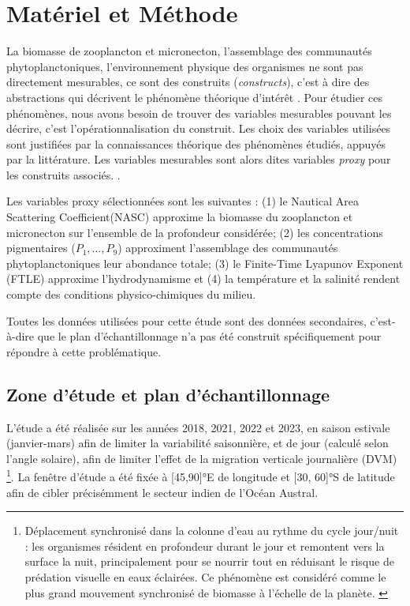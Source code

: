 \chapter{Matériel et Méthode}
La biomasse de zooplancton et micronecton, l'assemblage des communautés phytoplanctoniques, l'environnement physique des organismes ne sont pas directement mesurables, ce sont des construits (\textit{constructs}), c'est à dire des abstractions qui décrivent le phénomène théorique d'intérêt \cite{edwards2000nature}. Pour étudier ces phénomènes, nous avons besoin de trouver des variables mesurables pouvant les décrire, c'est l'opérationnalisation du construit. Les choix des variables utilisées sont justifiées par la connaissances théorique des phénomènes étudiés, appuyés par la littérature. Les variables mesurables sont alors dites variables \textit{proxy} pour les construits associés. \cite{shmueli2010explain}.
 
 
 Les variables proxy sélectionnées sont les suivantes : (1) le Nautical Area Scattering Coefficient(NASC) approxime la biomasse du zooplancton et micronecton sur l'ensemble de la profondeur considérée; (2) les concentrations pigmentaires ($P_1, \ldots, P_9$) approximent l'assemblage des communautés phytoplanctoniques leur abondance totale; (3) le Finite-Time Lyapunov Exponent (FTLE) approxime l'hydrodynamisme et (4) la température et la salinité rendent compte des conditions physico-chimiques du milieu.
 
 Toutes les données utilisées pour cette étude sont des données secondaires, c'est-à-dire que le plan d'échantillonnage n'a pas été construit spécifiquement pour répondre à cette problématique.
 
 \section{Zone d'étude et plan d'échantillonnage}
 
 L'étude a été réalisée sur les années 2018, 2021, 2022 et 2023, en saison estivale (janvier-mars) afin de limiter la variabilité saisonnière, et de jour (calculé selon l'angle solaire), afin de limiter l'effet de la migration verticale journalière (DVM) \footnote{Déplacement synchronisé dans la colonne d'eau au rythme du cycle jour/nuit : les organismes résident en profondeur durant le jour et remontent vers la surface la nuit, principalement pour se nourrir tout en réduisant le risque de prédation visuelle en eaux éclairées. Ce phénomène est considéré comme le plus grand mouvement synchronisé de biomasse à l'échelle de la planète. \cite{Bandara2021}}. La fenêtre d'étude a été fixée à [45,90]°E de longitude et [30, 60]°S de latitude afin de cibler précisémment le secteur indien de l'Océan Austral.
 
